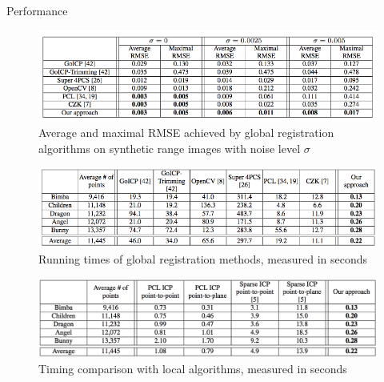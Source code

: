 \documentclass[aspectratio=1610]{beamer}
\begin{document}
\begin{frame}[allowframebreaks]{Performance}
\begin{figure}[htbp]
\begin{center}
\centering
\includegraphics[width=1.5\textheight,keepaspectratio]{imgs/RMSE_fgr.png}
\caption{Average and maximal RMSE achieved by global registration algorithms on synthetic range images with noise level $\sigma$}
\label{fig:fastgo_RMSR}
\end{center}
\end{figure}
\begin{figure}[htbp]
\begin{center}
\centering
\includegraphics[width=1.5\textheight,keepaspectratio]{imgs/Time_fgr.png}
\caption{Running times of global registration methods, measured in seconds}
\label{fig:fastgo_time}
\end{center}
\end{figure}


\begin{figure}[htbp]
\begin{center}
\centering
\includegraphics[width=1.5\textheight,keepaspectratio]{imgs/LocalTime_fgr.png}
\caption{Timing comparison with local algorithms, measured in seconds}
\label{fig:fastgo_lacalTime}
\end{center}
\end{figure}
\end{frame}
\end{document}
